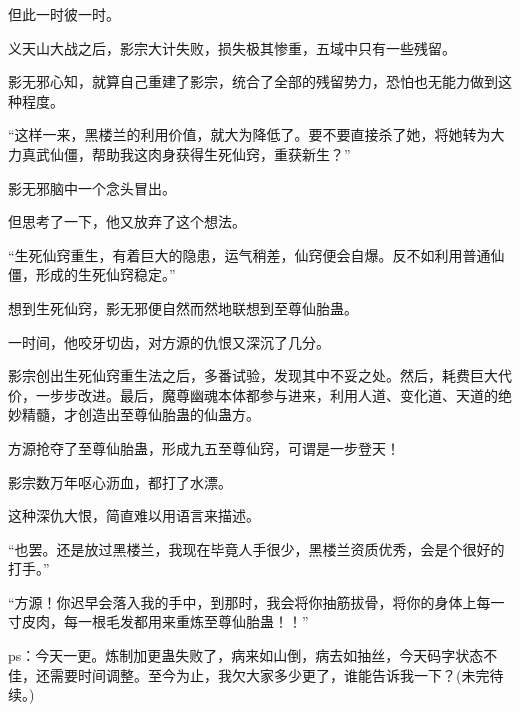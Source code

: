 \begin{this_body}
但此一时彼一时。

义天山大战之后，影宗大计失败，损失极其惨重，五域中只有一些残留。

影无邪心知，就算自己重建了影宗，统合了全部的残留势力，恐怕也无能力做到这种程度。

“这样一来，黑楼兰的利用价值，就大为降低了。要不要直接杀了她，将她转为大力真武仙僵，帮助我这肉身获得生死仙窍，重获新生？”

影无邪脑中一个念头冒出。

但思考了一下，他又放弃了这个想法。

“生死仙窍重生，有着巨大的隐患，运气稍差，仙窍便会自爆。反不如利用普通仙僵，形成的生死仙窍稳定。”

想到生死仙窍，影无邪便自然而然地联想到至尊仙胎蛊。

一时间，他咬牙切齿，对方源的仇恨又深沉了几分。

影宗创出生死仙窍重生法之后，多番试验，发现其中不妥之处。然后，耗费巨大代价，一步步改进。最后，魔尊幽魂本体都参与进来，利用人道、变化道、天道的绝妙精髓，才创造出至尊仙胎蛊的仙蛊方。

方源抢夺了至尊仙胎蛊，形成九五至尊仙窍，可谓是一步登天！

影宗数万年呕心沥血，都打了水漂。

这种深仇大恨，简直难以用语言来描述。

“也罢。还是放过黑楼兰，我现在毕竟人手很少，黑楼兰资质优秀，会是个很好的打手。”

“方源！你迟早会落入我的手中，到那时，我会将你抽筋拔骨，将你的身体上每一寸皮肉，每一根毛发都用来重炼至尊仙胎蛊！！”

ps：今天一更。炼制加更蛊失败了，病来如山倒，病去如抽丝，今天码字状态不佳，还需要时间调整。至今为止，我欠大家多少更了，谁能告诉我一下？(未完待续。)

\end{this_body}

